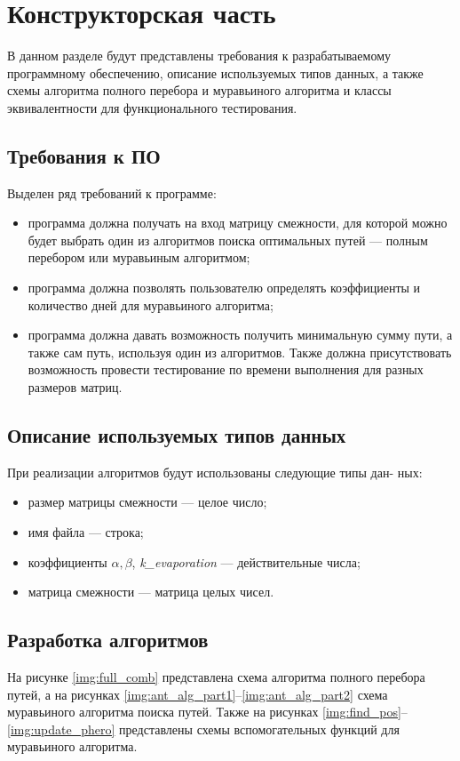 \chapter{Конструкторская часть}
В данном разделе будут представлены требования к разрабатываемому программному обеспечению, описание используемых типов данных, а также схемы алгоритма полного перебора и муравьиного алгоритма и классы эквивалентности для функционального тестирования.

\section{Требования к ПО}
Выделен ряд требований к программе:
\begin{itemize}
	\item программа должна получать на вход матрицу смежности, для которой можно будет выбрать один из алгоритмов поиска оптимальных путей --- полным перебором или муравьиным алгоритмом;
    \item программа должна позволять пользователю определять коэффициенты и количество дней для муравьиного алгоритма;
    \item программа должна давать возможность получить минимальную сумму пути, а также сам путь, используя один из алгоритмов. Также должна присутствовать возможность провести тестирование по времени выполнения для разных размеров матриц.
\end{itemize}

\section{Описание используемых типов данных}
При реализации алгоритмов будут использованы следующие типы дан-
ных:
\begin{itemize}
	\item размер матрицы смежности --- целое число;
	\item имя файла --- строка;
	\item коэффициенты $\alpha, \beta$, \textit{k\_evaporation} --- действительные числа;
	\item матрица смежности --- матрица целых чисел.
\end{itemize}

\section{Разработка алгоритмов}
На рисунке \ref{img:full_comb} представлена схема алгоритма полного перебора путей, а на рисунках \ref{img:ant_alg_part1}--\ref{img:ant_alg_part2} схема муравьиного алгоритма поиска путей. Также на рисунках \ref{img:find_pos}--\ref{img:update_phero} представлены схемы вспомогательных функций для муравьиного алгоритма.

